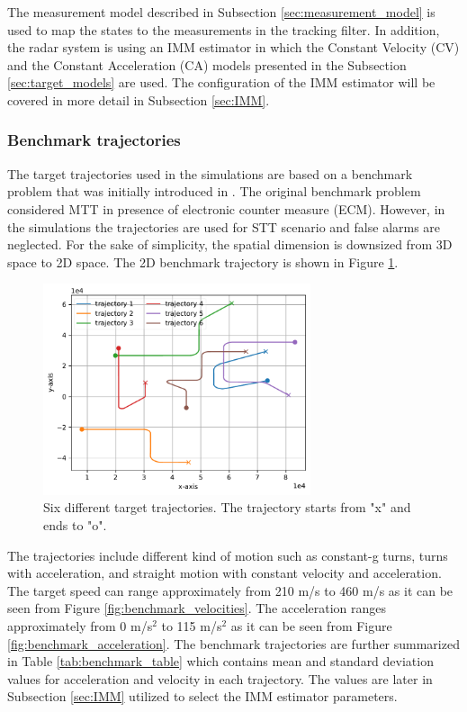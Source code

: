 \documentclass[english, 12pt, a4paper, elec, utf8, a-1b, online]{aaltothesis}
\begin{document}
The measurement model described in Subsection \ref{sec:measurement_model} is used to map the states to the measurements in the tracking filter.
In addition, the radar system is using an IMM estimator in which the Constant Velocity (CV) and the Constant Acceleration (CA) models presented in the Subsection \ref{sec:target_models} are used.
The configuration of the IMM estimator will be covered in more detail in Subsection \ref{sec:IMM}.


\subsubsection{Benchmark trajectories} \label{sec:benchmark_trajectories}

The target trajectories used in the simulations are based on a benchmark problem that was initially introduced in \cite{Blair1998}.
The original benchmark problem considered MTT in presence of electronic counter measure (ECM).
However, in the simulations the trajectories are used for STT scenario and false alarms are neglected.
For the sake of simplicity, the spatial dimension is downsized from 3D space to 2D space.
The 2D benchmark trajectory is shown in Figure \ref{fig:benchmark_trajectories}.
\begin{figure}[tb]
    \centering
    \includegraphics[width=0.7\textwidth]{figures/benchmark/trajectories.pdf}
    \caption{Six different target trajectories. The trajectory starts from "x" and ends to "o".}
    \label{fig:benchmark_trajectories}
\end{figure}
The trajectories include different kind of motion such as constant-g turns, turns with acceleration, and straight motion with constant velocity and  acceleration.
The target speed can range approximately from 210 m/s to 460 m/s as it can be seen from Figure \ref{fig:benchmark_velocities}.
The acceleration ranges approximately from 0 m/s$^2$ to 115 m/s$^2$ as it can be seen from Figure \ref{fig:benchmark_acceleration}.
The benchmark trajectories are further summarized in Table \ref{tab:benchmark_table} which contains mean and standard deviation values for acceleration and velocity in each trajectory.
The values are later in Subsection \ref{sec:IMM} utilized to select the IMM estimator parameters. 
\end{document}
